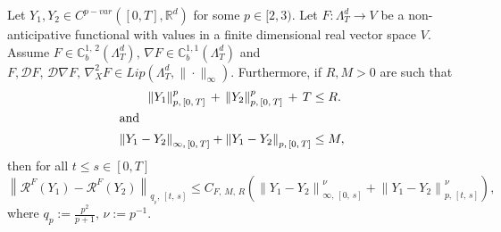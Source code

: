 \documentclass[AHL,Unicode,longabstracts,published]{cedram}
\newcommand{\bbC}{\mathbb{C}}
\newcommand{\calD}{\mathcal{D}}
\newcommand{\calR}{\mathcal{R}}
\newcommand{\Rr}{{\mathbb{R}}}
\begin{document}
\begin{lemm}\label{chp3theorem:contrcont}
Let $Y_1, Y_2\in C^{p-var}([0,T],\Rr^d)$ for some $p\in [2, 3)$. Let $F\colon \Lambda^d_T\to V$ be a non-anticipative functional with values in a finite dimensional real vector space $V$. Assume $ F\in \bbC^{1,\,2}_b(\Lambda^d_T),\, \nabla F\in \bbC^{1,1}_b(\Lambda^d_T)$ and $F, \calD F,\, \calD\nabla F,\, \nabla^2_{X} F\in Lip(\Lambda^d_T, \|\cdot\|_{\infty})$. Furthermore, if $R, M>0$ are such that
\begin{align*}
\left\|Y_1\right\|^p_{p,\,[0,\,T]}\,+\,\left\|Y_2\right\|^p_{p,\,[0,\,T]}\,+\,T&\leq R.
\\
\intertext{and}
\left\|Y_1-Y_2\right\|_{\infty,\,[0,\,T]}+\left\|Y_1-Y_2\right\|_{p,\,[0,\,T]}&\leq M,
\end{align*}
then for all $t\leq s\in[0,T]$
\[
\left\|\calR^{F}(Y_1)-\calR^{F}(Y_2)\right\|_{q_{_p},\,[t,\,s]}\leq C_{F,\,M,\,R}\left(\left\|Y_1-Y_2\right\|^{\nu}_{\infty,\,[0,\,s]}+\left\|Y_1-Y_2\right\|_{p,\,[t,\,s]}^{\nu}\right),
\]
where $q_p:=\frac {p^2} {p+1},\, \nu:=p^{-1}$.
\end{lemm}
\end{document}
